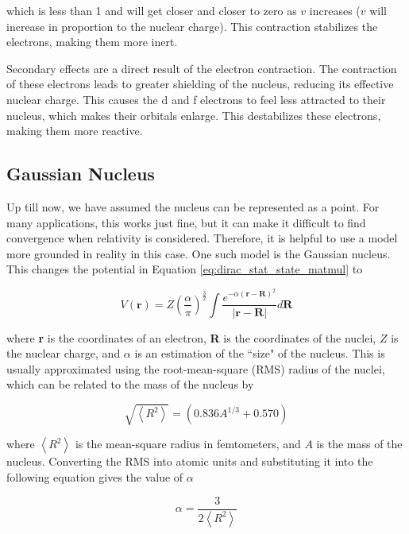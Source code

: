 which is less than 1 and will get closer and closer to zero as $v$ increases ($v$ will increase in proportion to the nuclear charge). This contraction stabilizes the electrons, making them more inert. 

Secondary effects are a direct result of the electron contraction. The contraction of these electrons leads to greater shielding of the nucleus, reducing its effective nuclear charge. This causes the d and f electrons to feel less attracted to their nucleus, which makes their orbitals enlarge. This destabilizes these electrons, making them more reactive\cite{Piela}.

\subsection{Gaussian Nucleus}
Up till now, we have assumed the nucleus can be represented as a point. For many applications, this works just fine, but it can make it difficult to find convergence when relativity is considered. Therefore, it is helpful to use a model more grounded in reality in this case. One such model is the Gaussian nucleus. This changes the potential in Equation \ref{eq:dirac_stat_state_matmul} to

\begin{equation}
\label{eq:gauss_nuc_pot}
V(\textbf{r}) = Z\left(\frac{\alpha}{\pi}\right)^{\frac{3}{2}}\int\frac{e^{-\alpha(\textbf{r} - \textbf{R})^{2}}}{|\textbf{r} - \textbf{R}|}d\textbf{R}
\end{equation}

where \textbf{r} is the coordinates of an electron, \textbf{R} is the coordinates of the nuclei, $Z$ is the nuclear charge, and $\alpha$ is an estimation of the ``size" of the nucleus. This is usually approximated using the root-mean-square (RMS) radius of the nuclei\cite{VISSCHER1997207}, which can be related to the mass of the nucleus by\cite{1985ADNDT..33..405J}

\begin{equation}
\label{eq:gauss_nuc_RMS}
\sqrt{\left<R^{2}\right>} = \left(0.836A^{1/3} + 0.570\right)
\end{equation}

where $\left<R^{2}\right>$ is the mean-square radius in femtometers, and $A$ is the mass of the nucleus. Converting the RMS into atomic units and substituting it into the following equation gives the value of $\alpha$\cite{VISSCHER1997207}

\begin{equation}
\label{eq:gauss_nuc_alpha}
\alpha = \frac{3}{2\left<R^{2}\right>}
\end{equation}
